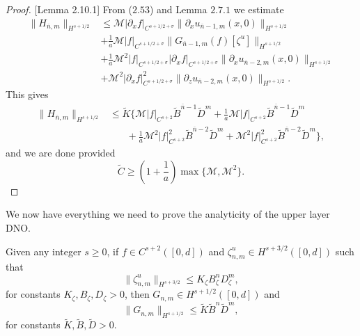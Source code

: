 \begin{proof}{[Lemma 2.10.1]} From ($2.53$) and Lemma $2.7.1$ we estimate
\begin{align*}\|H_{\overline{n},m}\|_{H^{s+1/2}}&\le \mathcal{M}|\partial_x f|_{C^{s+1/2+\sigma}}\|\partial_x u_{\overline{n}-1,m}(x,0)\|_{H^{s+1/2}}\\&
+\frac{1}{a}\mathcal{M}|f|_{C^{s+1/2+\sigma}}\|G_{\overline{n}-1,m}(f)[\zeta^u]\|_{H^{s+1/2}}\\&
+\frac{1}{a}\mathcal{M}^2|f|_{C^{s+1/2+\sigma}}|\partial_x f|_{C^{s+1/2+\sigma}}\|\partial_x u_{\overline{n}-2,m}(x,0)\|_{H^{s+1/2}}\\&
+\mathcal{M}^2|\partial_x f|^2_{C^{s+1/2+\sigma}}\|\partial_z u_{\overline{n}-2,m}(x,0)\|_{H^{s+1/2}}.
\end{align*}
This gives
\begin{align*}\|H_{\overline{n},m}\|_{H^{s+1/2}}&\le \tilde{K}\Big\{\mathcal{M}| f|_{C^{s+2}}\tilde{B}^{\overline{n}-1}\tilde{D}^{m} + \frac{1}{a}\mathcal{M}|f|_{C^{s+2}}\tilde{B}^{\overline{n}-1}\tilde{D}^{m} \\&~~~~~~~~+
\frac{1}{a}\mathcal{M}^2|f|_{C^{s+2}}^2\tilde{B}^{\overline{n}-2}\tilde{D}^{m} + \mathcal{M}^2|f|_{C^{s+2}}^2\tilde{B}^{\overline{n}-2}\tilde{D}^{m}\Big\},
\end{align*}
and we are done provided
$$\tilde{C} \ge \left(1+\frac{1}{a}\right)\max\{\mathcal{M},\mathcal{M}^2\}.$$
\end{proof}
\begin{flushleft}
We now have everything we need to prove the analyticity of the upper layer DNO.
\end{flushleft}
\vskip 0.1in
\begin{theorem} Given any integer $s\ge 0$, if $f\in C^{s+2}([0,d])$ and $\zeta^u_{n,m}\in H^{s+3/2}([0,d])$ such that
$$\|\zeta^u_{n,m}\|_{H^{s+3/2}} \le K_{\zeta}B_{\zeta}^nD_{\zeta}^m, $$
for constants $K_{\zeta},B_{\zeta},D_{\zeta} > 0$, then $G_{n,m}\in H^{s+1/2}([0,d])$ and
\begin{equation} \|G_{n,m}\|_{H^{s+1/2}} \le \tilde{K}\tilde{B}^{n}\tilde{D}^{m},\end{equation}
for constants $\tilde{K},\tilde{B},\tilde{D} > 0$.
\end{theorem}
\vskip 0.1in
